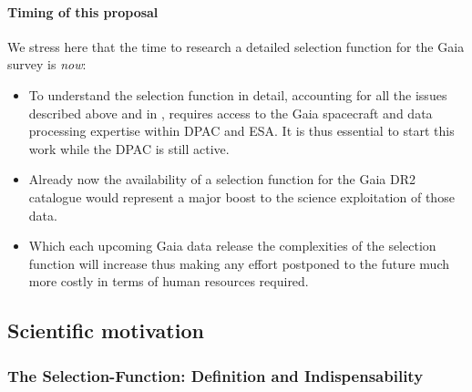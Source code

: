 \paragraph{Timing of this proposal} We stress here that the time to research a detailed selection function for the Gaia survey is \emph{now}:
\begin{itemize}
    \item To understand the selection function in detail, accounting for all the issues described above and in , requires access to the Gaia spacecraft and data processing expertise within DPAC and ESA. It is thus essential to start this work while the DPAC is still active.
    \item Already now the availability of a selection function for the Gaia DR2 catalogue would represent a major boost to the science exploitation of those data.
    \item Which each upcoming Gaia data release the complexities of the selection function will increase thus making any effort postponed to the future much more costly in terms of human resources required.
\end{itemize}

\subsection{Scientific motivation}
\label{sec:scientific-motivation}

\subsubsection{The Selection-Function: Definition and Indispensability }
%
%

